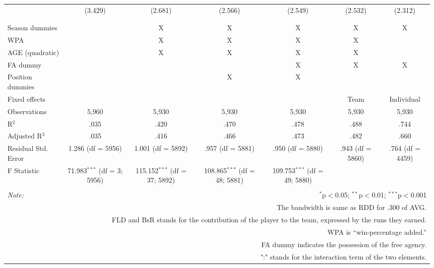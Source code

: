 \begin{table}[H]
\begin{tabular}{@{\extracolsep{5pt}}lcccccc}
  & (3.429) & (2.681) & (2.566) & (2.549) & (2.532) & (2.312) \\
  & & & & & & \\
\hline \\[-1.8ex]
Season dummies &  & X & X & X & X & X \\
WPA &  & X & X & X & X &  \\
AGE (quadratic) &  & X & X & X & X &  \\
FA dummy &  &  &  & X & X & X \\
Position dummies &  &  & X & X &  &  \\
Fixed effects &  &  &  &  & Team & Individual \\
Observations & 5,960 & 5,930 & 5,930 & 5,930 & 5,930 & 5,930 \\
R$^{2}$ & .035 & .420 & .470 & .478 & .488 & .744 \\
Adjusted R$^{2}$ & .035 & .416 & .466 & .473 & .482 & .660 \\
Residual Std. Error & 1.286 (df = 5956) & 1.001 (df = 5892) & .957 (df = 5881) & .950 (df = 5880) & .943 (df = 5860) & .764 (df = 4459) \\
F Statistic & 71.983$^{***}$ (df = 3; 5956) & 115.152$^{***}$ (df = 37; 5892) & 108.865$^{***}$ (df = 48; 5881) & 109.753$^{***}$ (df = 49; 5880) &  &  \\
\hline
\hline \\[-1.8ex]
\textit{Note:}  & \multicolumn{6}{r}{$^{*}$p$<$0.05; $^{**}$p$<$0.01; $^{***}$p$<$0.001} \\
& \multicolumn{6}{r}{The bandwidth is same as RDD for .300 of AVG.} \\
& \multicolumn{6}{r}{FLD and BsR stands for the contribution of the player to the team, expressed by the runs they earned.} \\
& \multicolumn{6}{r}{WPA is ``win-percentage added.''} \\
& \multicolumn{6}{r}{FA dummy indicates the possession of the free agency.}\\
& \multicolumn{6}{r}{":" stands for the interaction term of the two elements.} \\
\end{tabular}
\end{table}
